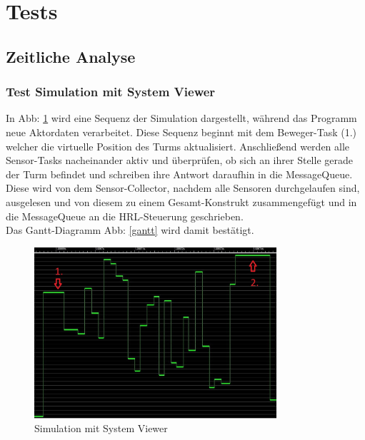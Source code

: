 \section{Tests}
\subsection{Zeitliche Analyse}
\subsubsection{Test Simulation mit System Viewer}
In Abb: \ref{fig4} wird eine Sequenz der Simulation dargestellt, während das Programm neue Aktordaten verarbeitet. Diese Sequenz beginnt mit dem Beweger-Task (1.) welcher die virtuelle Position des Turms aktualisiert. Anschließend werden alle Sensor-Tasks nacheinander aktiv und überprüfen, ob sich an ihrer Stelle gerade der Turm befindet und schreiben ihre Antwort daraufhin in die MessageQueue. Diese wird von dem Sensor-Collector, nachdem alle Sensoren durchgelaufen sind, ausgelesen und von diesem zu einem Gesamt-Konstrukt zusammengefügt und in die MessageQueue an die HRL-Steuerung geschrieben. \\
Das Gantt-Diagramm  Abb: \ref{gantt} wird damit bestätigt.

\begin{figure}[H]
	\centering
  \includegraphics[width=0.8\textwidth]{diagrams/simulation_erklaerung.jpg}
	\caption{Simulation mit System Viewer}
	\label{fig4}
\end{figure}

